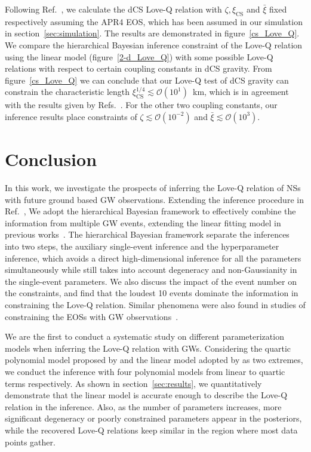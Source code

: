 \documentclass[a4paper,11pt]{article}
\begin{document}
Following Ref.~\cite{Yagi_2017}, we calculate the dCS Love-Q relation with $\zeta, \xi_{\mathrm{CS}}$ and $\bar{\xi}$ 
fixed respectively assuming the APR4 EOS, which has been assumed in our simulation 
in section~\ref{sec:simulation}. The results are demonstrated in figure~\ref{cs_Love_Q}. 
We compare the hierarchical Bayesian inference constraint of the Love-Q relation 
using the linear model (figure~\ref{2-d_Love_Q}) with some possible Love-Q 
relations with respect to certain coupling constants in dCS gravity. From 
figure~\ref{cs_Love_Q} we can conclude that our Love-Q test of dCS gravity can 
constrain the characteristic length $\xi_{\mathrm{CS}}^{1/4} \lesssim \mathcal{O}(10^1)$~km, 
which is in agreement with the results given by Refs.~\cite{Yagi:2013bca,Yagi:2013awa}. 
For the other two coupling constants, our inference results place constraints of 
$\zeta \lesssim \mathcal{O}(10^{-2})$ and $\bar{\xi} \lesssim \mathcal{O}(10^{3})$.

\section{Conclusion}
\label{sec:conclusion}

In this work, we investigate the prospects of inferring the Love-Q relation of NSs
with future ground based GW observations.
Extending the inference procedure in
Ref.~\cite{Samajdar:2020xrd}, 
We adopt the hierarchical Bayesian framework to effectively combine the
information from multiple GW events, extending the linear fitting model in
previous works~\cite{Samajdar:2020xrd}. The hierarchical Bayesian framework
separate the inferences into two steps, the auxiliary single-event
inference and the hyperparameter inference, which avoids a direct high-dimensional
inference for all the parameters simultaneously while still takes into account
degeneracy and non-Gaussianity in the single-event parameters. We also discuss
the impact of the event number on the constraints, and find that the loudest 10 events
dominate the information in constraining the Love-Q relation. Similar phenomena
were also found in studies of constraining the EOSs with GW observations~\cite{Lackey:2014fwa,Wang:2024xon}.

We are the first to conduct a systematic study on different parameterization models
when inferring the Love-Q relation with GWs. Considering the quartic polynomial
model proposed by \citet{Yagi:2013awa} and the linear model adopted by
\citet{Samajdar:2020xrd} as two extremes, we conduct the inference with
four polynomial models
from linear to quartic terms respectively. As shown in
section~\ref{sec:results}, we quantitatively demonstrate that
the linear model is accurate enough to describe the Love-Q relation in the
inference. Also, as the number of parameters increases, more significant
degeneracy or poorly constrained parameters appear in the posteriors, while the recovered Love-Q relations keep similar in the region where most data points gather.
\end{document}
